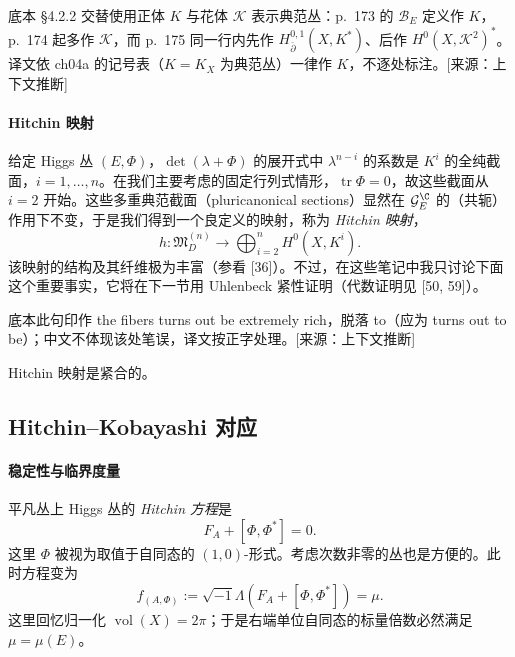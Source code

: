 \begin{annote}底本 §4.2.2 交替使用正体 $K$ 与花体 $\mathcal{K}$ 表示典范丛：p.~173 的 $\mathcal{B}_E$ 定义作 $K$，p.~174 起多作 $\mathcal{K}$，而 p.~175 同一行内先作 $H^{0,1}_{\bar\partial}(X,K^*)$、后作 $H^0(X,\mathcal{K}^2)^*$。译文依 ch04a 的记号表（$K=K_X$ 为典范丛）一律作 $K$，不逐处标注。[来源：上下文推断]\end{annote}

\paragraph{Hitchin 映射} 给定 Higgs 丛 $(E,\Phi)$，$\det(\lambda+\Phi)$ 的展开式中 $\lambda^{n-i}$ 的系数是 $K^i$ 的全纯截面，$i=1,\dots,n$。在我们主要考虑的固定行列式情形，$\operatorname{tr}\Phi=0$，故这些截面从 $i=2$ 开始。这些多重典范截面（pluricanonical sections）显然在 $\mathcal{G}_E^\C$ 的（共轭）作用下不变，于是我们得到一个良定义的映射，称为 \emph{Hitchin 映射}，
\begin{equation}
h\colon\mathfrak{M}_D^{(n)}\longrightarrow\bigoplus_{i=2}^{n}H^0(X,K^i).
\label{eq:4.15}\tag{4.15}
\end{equation}
该映射的结构及其纤维极为丰富（参看 [36]）。不过，在这些笔记中我只讨论下面这个重要事实，它将在下一节用 Uhlenbeck 紧性证明（代数证明见 [50, 59]）。\begin{annote}底本此句印作 the fibers turns out be extremely rich，脱落 to（应为 turns out to be）；中文不体现该处笔误，译文按正字处理。[来源：上下文推断]\end{annote}

\begin{theorem}\label{thm:4.2.15}
Hitchin 映射是紧合的。
\end{theorem}

\subsection{Hitchin--Kobayashi 对应}

\paragraph{稳定性与临界度量} 平凡丛上 Higgs 丛的 \emph{Hitchin 方程}是
\begin{equation}
F_A+[\Phi,\Phi^*]=0.
\label{eq:4.16}\tag{4.16}
\end{equation}
这里 $\Phi$ 被视为取值于自同态的 $(1,0)$-形式。考虑次数非零的丛也是方便的。此时方程变为
\begin{equation}
f_{(A,\Phi)}:=\sqrt{-1}\Lambda(F_A+[\Phi,\Phi^*])=\mu.
\label{eq:4.17}\tag{4.17}
\end{equation}
这里回忆归一化 $\operatorname{vol}(X)=2\pi$；于是右端单位自同态的标量倍数必然满足 $\mu=\mu(E)$。


